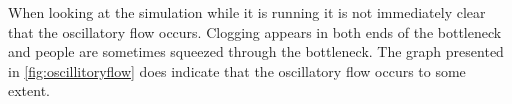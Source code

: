 When looking at the simulation while it is running it is not 
immediately clear that the oscillatory flow occurs. Clogging 
appears in both ends of the bottleneck and people are sometimes 
squeezed through the bottleneck. The graph presented in 
\ref{fig:oscillitoryflow} does indicate that the oscillatory 
flow occurs to some extent.

% 
% 
% 
% 
% 
% 
% 
